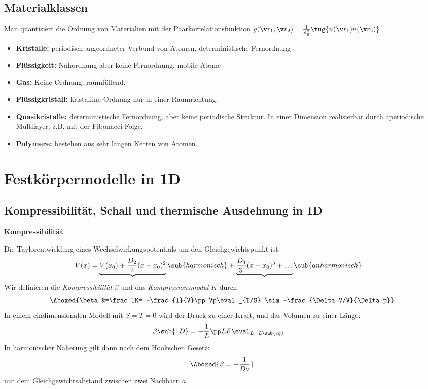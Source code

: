 \documentclass[bfvec]{summery_5.0}
\begin{document}
\subsection{Materialklassen}
Man quantisiert die Ordnung von Materialien mit der Paarkorrelationsfunktion $g(\v r_1, \v r_2) = \frac{1}{n_0^2} \tug{n(\v r_1)n(\v r_2)}$
\begin{itemize}
    \item {\bf Kristalle:} periodisch angeordneter Verbund von Atomen, deterministische Fernordnung
    \item {\bf Flüssigkeit:} Nahordnung aber keine Fernordnung, mobile Atome
    \item {\bf Gas:} Keine Ordnung, raumfüllend.
    \item {\bf Flüssigkristall:} kristalline Ordnung nur in einer Raumrichtung.
    \item {\bf Quasikristalle:} deterministische Fernordnung, aber keine periodische Struktur. In einer Dimension realisierbar durch aperiodische Multilayer, z.B. mit der Fibonacci-Folge.
    \item {\bf Polymere:} bestehen aus sehr langen Ketten von Atomen.
\end{itemize}

\section{Festkörpermodelle in 1D}
\subsection{Kompressibilität, Schall und thermische Ausdehnung in 1D}
{\bf Kompressibilität}

Die Taylorentwicklung eines Wechselwirkungspotentials um den Gleichgewichtspunkt ist:
\begin{align*}
        V(x) &= \underbrace{V(x_0) + \frac{D_2}{2}(x-x_0)^2}\sub{harmonisch} + \underbrace{\frac{D_3}{3!}(x-x_0)^3 + \dots}\sub{anharmonisch}
\end{align*}
Wir definieren die \emph{Kompressibilität} $\beta$ und das \emph{Kompressionsmodul} $K$ durch
\begin{align*}
        \Aboxed{\beta &=\frac 1K= -\frac{1}{V}\pp Vp\eval_{T/S} \sim-\frac{\Delta V/V}{\Delta p}}
\end{align*}
In einem eindimensionalen Modell mit $S=T=0$ wird der Druck zu einer Kraft, und das Volumen zu einer Länge:
\begin{align*}
    \beta\sub{1D} &= -\frac1L \pp LF\eval_{L=L\sub{eq}}
\end{align*}
In harmonischer Näherung gilt dann nach dem Hookschen Gesetz:
\begin{align*}
    \Aboxed{\beta=-\frac1{Da}}
\end{align*}
mit dem Gleichgewichtsabstand zwischen zwei Nachbarn $a$.
\end{document}

